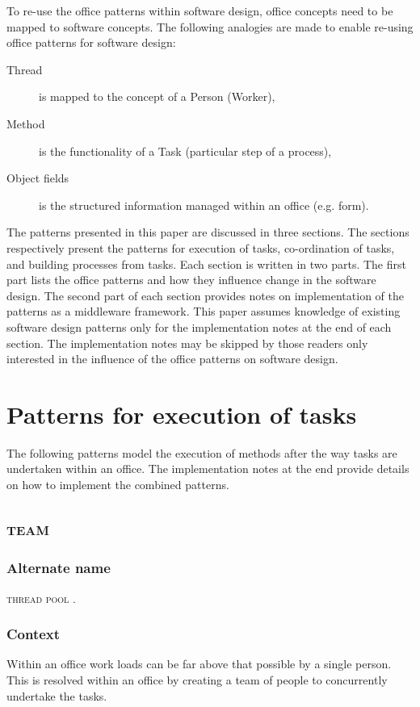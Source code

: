 \documentclass[prodmode]{style/acmlarge}
\begin{document}
To re-use the office patterns within software design, office concepts need to be
mapped to software concepts.  The following analogies are made to enable
re-using office patterns for software design:
\begin{description}
  \item[Thread] is mapped to the concept of a Person (Worker),
  \item[Method] is the functionality of a Task (particular step of a process),
  \item[Object fields] is the structured information managed within an office (e.g. form).
\end{description}

The patterns presented in this paper are discussed in three sections.  The
sections respectively present the patterns for execution of tasks, co-ordination
of tasks, and building processes from tasks.  Each section is written in two
parts.  The first part lists the office patterns and how they influence change
in the software design.  The second part of each section provides notes on
implementation of the patterns as a middleware framework.  This paper assumes
knowledge of existing software design patterns only for the implementation notes
at the end of each section.  The implementation notes may be skipped by those
readers only interested in the influence of the office patterns on software
design.



\section{Patterns for execution of tasks}

The following patterns model the execution of methods after the way tasks are
undertaken within an office.  The implementation notes at the end provide
details on how to implement the combined patterns.


\subsection{\textsc{\textbf{team}}}

\subsubsection*{Alternate name} \textsc{thread pool} \cite{thread-per-request}.

\subsubsection*{Context} Within an office work loads can be far above that
possible by a single person. This is resolved within an office by creating a
team of people to concurrently undertake the tasks.
\end{document}
